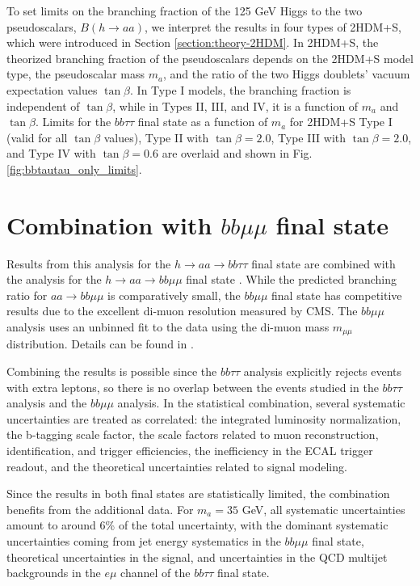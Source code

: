 To set limits on the branching fraction of the 125 GeV Higgs to the two pseudoscalars, $B(h \rightarrow aa)$, we interpret the results in four types of 2HDM+S, which were introduced in Section \ref{section:theory-2HDM}. In 2HDM+S, the theorized branching fraction of the pseudoscalars depends on the 2HDM+S model type, the pseudoscalar mass $m_a$, and the ratio of the two Higgs doublets' vacuum expectation values $\tan\beta$. In Type I models, the branching fraction is independent of $\tan\beta$, while in Types II, III, and IV, it is a function of $m_a$ and $\tan\beta$. Limits for the $bb\tau\tau$ final state as a function of $m_a$ for 2HDM+S Type I (valid for all $\tan\beta$ values), Type II with $\tan\beta = 2.0$, Type III with $\tan\beta = 2.0$, and Type IV with $\tan\beta = 0.6$ are overlaid and shown in Fig. \ref{fig:bbtautau_only_limits}.


\section{Combination with \texorpdfstring{$bb\mu\mu$}{bbmumu} final state}
\label{section:ch-10-combination-procedure-with-bbmumu}
Results from this analysis for the $h \rightarrow aa \rightarrow bb\tau\tau$ final state are combined with the analysis for the $h \rightarrow aa \rightarrow bb\mu\mu$ final state \cite{CMS-AN-21-058-bbmumu}. While the predicted branching ratio for $aa \rightarrow bb\mu\mu$ is comparatively small, the $bb\mu\mu$ final state has competitive results due to the excellent di-muon resolution measured by CMS. The $bb\mu\mu$ analysis uses an unbinned fit to the data using the di-muon mass $m_{\mu\mu}$ distribution. Details can be found in \cite{CMS-AN-21-058-bbmumu}.

Combining the results is possible since the $bb\tau\tau$ analysis explicitly rejects events with extra leptons, so there is no overlap between the events studied in the $bb\tau\tau$ analysis and the $bb\mu\mu$ analysis. In the statistical combination, several systematic uncertainties are treated as correlated: the integrated luminosity normalization, the b-tagging scale factor, the scale factors related to muon reconstruction, identification, and trigger efficiencies, the inefficiency in the ECAL trigger readout, and the theoretical uncertainties related to signal modeling.

Since the results in both final states are statistically limited, the combination benefits from the additional data. For $m_a = 35$ GeV, all systematic uncertainties amount to around 6\% of the total uncertainty, with the dominant systematic uncertainties coming from jet energy systematics in the $bb\mu\mu$ final state, theoretical uncertainties in the signal, and uncertainties in the QCD multijet backgrounds in the $e\mu$ channel of the $bb\tau\tau$ final state.

